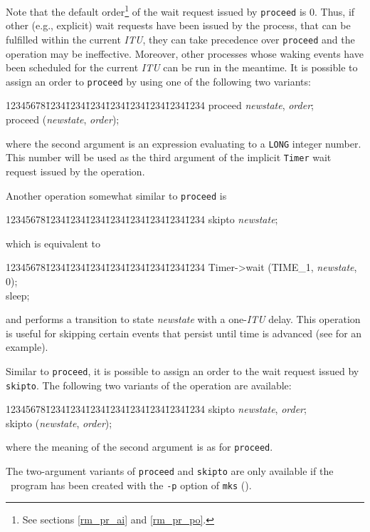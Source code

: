 Note that the default order\footnote{See sections \ref{rm_pr_ai} and
\ref{rm_pr_po}.}
of the wait request issued by {\tt proceed} is 0.
Thus, if other (e.g., explicit) wait requests have been issued by the process,
that can be fulfilled within the current {\em ITU}, they can take
precedence over {\tt proceed} and the operation may be ineffective.
Moreover, other processes whose waking events have been scheduled for the
current {\em ITU\/} can be run in the meantime.
It is possible to assign an order to {\tt proceed} by using
one of the following two variants:
{\tt\begin{tabbing}
12345678\=1234\=1234\=1234\=1234\=1234\=1234\=1234\=1234\kill
\>proceed {\em newstate}, {\em order\/};\\
\>proceed ({\em newstate}, {\em order\/});
\end{tabbing}}
\noindent
where the second argument is an expression evaluating to a {\tt LONG} integer
number.
This number will be used as the third argument of the implicit {\tt Timer}
wait request issued by the operation.

Another operation somewhat similar to {\tt proceed} is
{\tt\begin{tabbing}
12345678\=1234\=1234\=1234\=1234\=1234\=1234\=1234\=1234\kill
\>skipto {\em newstate\/};
\end{tabbing}}
\noindent
which is equivalent to
{\tt\begin{tabbing}
12345678\=1234\=1234\=1234\=1234\=1234\=1234\=1234\=1234\kill
\>Timer->wait (TIME\_1, {\em newstate}, 0); \\
\>sleep;
\end{tabbing}}
\noindent
and performs a transition to state {\em newstate\/}
with a one-{\em ITU\/} delay.
This operation is useful
for skipping certain events that persist until time is advanced
(see  for an example).

Similar to {\tt proceed}, it is possible to assign an order to the
wait request issued by {\tt skipto}.
The following two variants of the operation are available:
{\tt\begin{tabbing}
12345678\=1234\=1234\=1234\=1234\=1234\=1234\=1234\=1234\kill
\>skipto {\em newstate}, {\em order\/};\\
\>skipto ({\em newstate}, {\em order\/});
\end{tabbing}}
\noindent
where the meaning of the second argument is as for {\tt proceed}.

The two-argument variants of {\tt proceed} and {\tt skipto} are only
available if the \smurph\ program has been created with the 
{\tt -p} option of {\tt mks} ().


